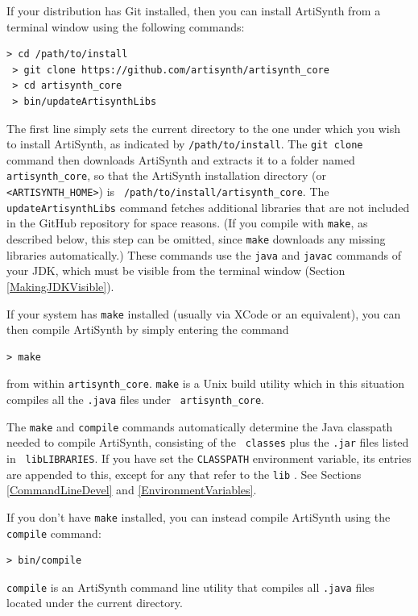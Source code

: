 If your \SYSTEM{} distribution has Git installed, then you can
install ArtiSynth from a terminal window using the following
commands:
%
\begin{lstlisting}[]
 > cd /path/to/install
 > git clone https://github.com/artisynth/artisynth_core
 > cd artisynth_core
 > bin/updateArtisynthLibs
\end{lstlisting}
%
The first line simply sets the current directory to the one under which
you wish to install ArtiSynth, as indicated by {\tt /path/to/install}.
The {\tt git clone} command then downloads ArtiSynth and extracts it
to a folder named {\tt artisynth\_core}, so that the ArtiSynth
installation directory (or {\tt <ARTISYNTH\_HOME>}) is {\tt
/path/to/install/artisynth\_core}. The {\tt updateArtisynthLibs}
command fetches additional libraries that are not included in the
GitHub repository for space reasons. (If you compile with {\tt make},
as described below, this step can be omitted, since {\tt make}
downloads any missing libraries automatically.) These commands use
the {\tt java} and {\tt javac} commands of your JDK, which must be
visible from the terminal window (Section \ref{MakingJDKVisible}).
\ifMacOS

If your system has {\tt make} installed (usually via XCode or
an equivalent), you can then compile ArtiSynth by simply entering
the command 
%
\begin{lstlisting}[]
 > make
\end{lstlisting}
%
from within {\tt artisynth\_core}. {\tt make} is a Unix build utility
which in this situation compiles all the {\tt .java} files under {\tt
artisynth\_core}. 

\begin{sideblock}
The {\tt make} and {\tt compile} commands automatically determine the
Java classpath needed to compile ArtiSynth, consisting of the {\tt
classes} \directory{} plus the {\tt .jar} files listed in {\tt
lib\SEP LIBRARIES}. If you have set the {\tt CLASSPATH} environment
variable, its entries are appended to this, except for any that refer
to the {\tt lib} \directory{}. See Sections \ref{CommandLineDevel}
and \ref{EnvironmentVariables}.
\end{sideblock}

If you don't have {\tt make} installed, you can instead compile
ArtiSynth using the {\tt compile} command:
%
\begin{lstlisting}[]
 > bin/compile
\end{lstlisting}
%
{\tt compile} is an ArtiSynth command line utility that compiles all
{\tt .java} files located under the current directory.
\fi %
\ifLinux

